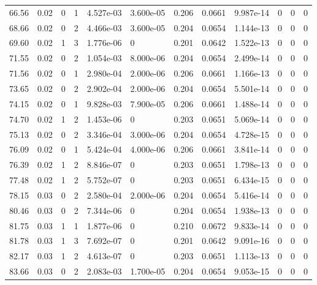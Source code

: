 \documentclass[preview]{standalone}
\begin{document}
{{{\begin{tabular}{L{1.2cm}C{1.2cm} C{0.3cm}C{0.5cm} C{1.4cm}C{1.4cm} C{1.4cm}C{1.4cm} C{1.6cm}C{1.6cm} C{1.6cm}C{1.6cm}}
  66.56  &  0.02  & 0     &  1 &  4.527e-03  & 3.600e-05  &  0.206&   0.0661& 9.987e-14 & 0   &  0 & 0  \\ 
  68.66  &  0.02  & 0     &  2 &  4.466e-03  & 3.600e-05  &  0.204&   0.0654& 1.144e-13 & 0   &  0 & 0  \\ 
  69.60  &  0.02  & 1     &  3 &  1.776e-06  & 0  &  0.201&   0.0642& 1.522e-13 & 0   &  0 & 0  \\ 
  71.55  &  0.02  & 0     &  2 &  1.054e-03  & 8.000e-06  &  0.204&   0.0654& 2.499e-14 & 0   &  0 & 0  \\ 
  71.56  &  0.02  & 0     &  1 &  2.980e-04  & 2.000e-06  &  0.206&   0.0661& 1.166e-13 & 0   &  0 & 0  \\ 
  73.65  &  0.02  & 0     &  2 &  2.902e-04  & 2.000e-06  &  0.204&   0.0654& 5.501e-14 & 0   &  0 & 0  \\ 
  74.15  &  0.02  & 0     &  1 &  9.828e-03  & 7.900e-05  &  0.206&   0.0661& 1.488e-14 & 0   &  0 & 0  \\ 
  74.70  &  0.02  & 1     &  2 &  1.453e-06  & 0  &  0.203&   0.0651& 5.069e-14 & 0   &  0 & 0  \\ 
  75.13  &  0.02  & 0     &  2 &  3.346e-04  & 3.000e-06  &  0.204&   0.0654& 4.728e-15 & 0   &  0 & 0  \\ 
  76.09  &  0.02  & 0     &  1 &  5.424e-04  & 4.000e-06  &  0.206&   0.0661& 3.841e-14 & 0   &  0 & 0  \\ 
  76.39  &  0.02  & 1     &  2 &  8.846e-07  & 0  &  0.203&   0.0651& 1.798e-13 & 0   &  0 & 0  \\ 
  77.48  &  0.02  & 1     &  2 &  5.752e-07  & 0  &  0.203&   0.0651& 6.434e-15 & 0   &  0 & 0  \\ 
  78.15  &  0.03  & 0     &  2 &  2.580e-04  & 2.000e-06  &  0.204&   0.0654& 5.416e-14 & 0   &  0 & 0  \\ 
  80.46  &  0.03  & 0     &  2 &  7.344e-06  & 0  &  0.204&   0.0654& 1.938e-13 & 0   &  0 & 0  \\ 
  81.75  &  0.03  & 1     &  1 &  1.877e-06  & 0  &  0.210&   0.0672& 9.833e-14 & 0   &  0 & 0  \\ 
  81.78  &  0.03  & 1     &  3 &  7.692e-07  & 0  &  0.201&   0.0642& 9.091e-16 & 0   &  0 & 0  \\ 
  82.17  &  0.03  & 1     &  2 &  4.613e-07  & 0  &  0.203&   0.0651& 1.113e-13 & 0   &  0 & 0  \\ 
  83.66  &  0.03  & 0     &  2 &  2.083e-03  & 1.700e-05  &  0.204&   0.0654& 9.053e-15 & 0   &  0 & 0  \\ 

\end{tabular}}}}
\end{document}
